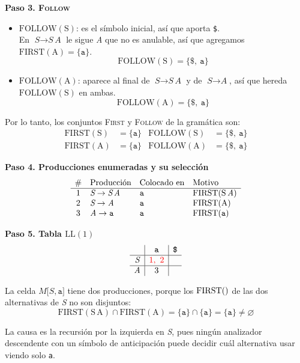 \documentclass[12pt,letterpaper]{article}
\newcommand{\nt}[1]{\textit{#1}}
\newcommand{\tk}[1]{\texttt{#1}}
\newcommand{\tx}[1]{\text{#1}}
\newcommand{\First}[1]{\mathrm{FIRST}(#1)}
\newcommand{\Follow}[1]{\mathrm{FOLLOW}(#1)}
\renewcommand{\ll}{\mathrm{LL(1)}}
\newcommand{\conf}[1]{\textcolor{red}{#1}}
\begin{document}
\begin{enumerate}[label=\arabic*.]
  \textbf{Paso 3. \textsc{Follow}}
  \begin{itemize}
  \item $\Follow{\tx{S}}$: es el símbolo inicial, así que aporta \tk{\$}.\\
    En $\nt{S}\to\nt{S}\,\nt{A}$ le sigue \nt{A} que no es anulable, así que agregamos
    $\First{\tx{A}} = \{\tk{a}\}$.
    \[
    \Follow{\tx{S}} = \{\tk{\$},\ \tk{a}\}
    \]

  \item $\Follow{\tx{A}}$: aparece al final de $\nt{S}\to\nt{S}\,\nt{A}$ y de $\nt{S}\to\nt{A}$, así que hereda
    $\Follow{\tx{S}}$ en ambas.
    \[
    \Follow{\tx{A}} = \{\tk{\$},\ \tk{a}\}
    \]
  \end{itemize}

  Por lo tanto, los conjuntos \textsc{First} y \textsc{Follow} de la gramática son:
  \[
  \begin{aligned}
    \First{\tx{S}} &= \{\tk{a}\} & \Follow{\tx{S}} &= \{\tk{\$},\ \tk{a}\} \\
    \First{\tx{A}} &= \{\tk{a}\} & \Follow{\tx{A}} &= \{\tk{\$},\ \tk{a}\}
  \end{aligned}
  \]

  \textbf{Paso 4. Producciones enumeradas y su selección}
  \[
  \begin{array}{c l l l}
    \# & \text{Producción} & \text{Colocado en} & \text{Motivo} \\ \hline
    1 & \nt{S}\to\nt{S}\,\nt{A} & \tk{a} & \First{\tx{S}\,\nt{A}} \\
    2 & \nt{S}\to\nt{A} & \tk{a} & \First{\tx{A}} \\
    3 & \nt{A}\to\tk{a} & \tk{a} & \First{\tk{a}}
  \end{array}
  \]

  \textbf{Paso 5. Tabla $\ll$}
  \[
  \begin{array}{c|c|c}
    & \tk{a} & \tk{\$} \\ \hline
    \nt{S} & \conf{1,\ 2} & \\ \hline
    \nt{A} & 3 & \\
  \end{array}
  \]

  La celda $M\tk{[}\nt{S},\tk{a}\tk{]}$ tiene dos producciones, porque los $\First$ de las dos alternativas de
  \nt{S} no son disjuntos:
  \[
  \First{\tx{S}\,\tx{A}} \cap \First{\tx{A}} = \{\tk{a}\} \cap \{\tk{a}\} = \{\tk{a}\} \neq \varnothing
  \]
  
  La causa es la recursión por la izquierda en \nt{S}, pues ningún analizador descendente con un símbolo de
  anticipación puede decidir cuál alternativa usar viendo solo \tk{a}.\\


\end{enumerate}
\end{document}
